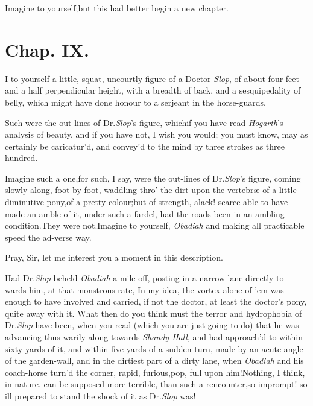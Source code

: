 \documentclass{article}
\begin{document}
Imagine to yourself;\tsk but this had better begin a new
chapter.


\section{Chap. IX.}

\lettrine{I}{} to yourself a little, squat, uncourtly figure of a Doctor
\textit{Slop}, of\break
about four feet and a half perpendicular\pb
height, with a breadth of back, and a sesqui\-pedality of belly, which might have done honour to a serjeant in
the horse-guards.

Such were the out-lines of Dr.\@ \textit{Slop}’s figure, which\tsk if you have read
\textit{Ho\-garth}’s analysis of beauty, and if you have not, I wish you would;\tsh
you must know, may as certainly be caricatur’d, and convey’d to the mind by three
strokes as three hundred.

Imagine such a one,\tsk for such, I say, were the out-lines of
Dr.\@ \textit{Slop}’s figure, coming slowly along, foot by foot,
waddling thro’ the dirt upon the vertebræ of a little
diminutive pony,\tsk of a pretty colour;\tsk but of strength,\tsk
alack!\tsh\break
scarce able to have made an amble of it,\break
under such a fardel, had the roads been\pb
in an ambling condition.\tsh They were not.\tsh Imagine
to yourself, \textit{Obadiah}
and making all practicable speed the ad-\break verse way.

Pray, Sir, let me interest you a moment in this description.

Had Dr.\@ \textit{Slop} beheld \textit{Obadiah} a mile\break
off, posting in a narrow lane directly to-\break
wards him, at that monstrous rate,\tsh\break
{}
\pb
{}
\tsh In my idea, the vortex alone of\break
’em was enough to have involved and carried, if not the doctor, at least the
doctor’s pony, quite away with it. What then do you think
must the terror and hydrophobia of Dr.\@ \textit{Slop} have been, when
you read (which you are just going to do) that he was advancing
thus warily along towards \textit{Shandy-Hall}, and had
approach’d to
within sixty yards of it, and within five yards of a sudden turn,
made by an acute angle of the garden-wall,\break
\tsk and in the dirtiest part of a dirty lane,\break
\tsk when \textit{Obadiah} and his coach-horse 
turn’d the corner, rapid, furious,\tsk pop,\break
\tsk full upon him!\tsk Nothing, I think, in
nature, can be supposed more terrible,
than such a rencounter,\tsk so imprompt! 
so ill prepared to stand the shock
of it as Dr.\@ \textit{Slop} was!
\end{document}
